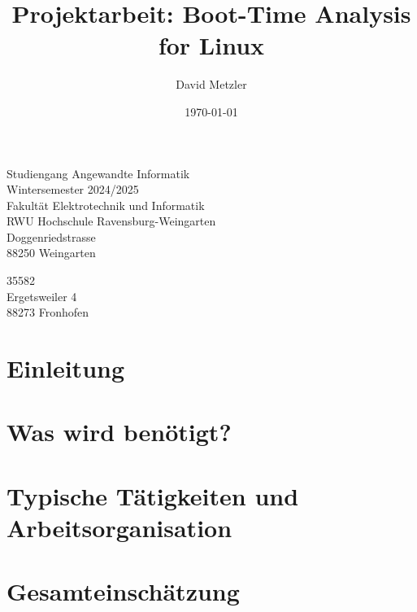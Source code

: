 \documentclass[12pt, a4paper]{scrartcl}
\author{David Metzler}
\title{Projektarbeit: Boot-Time Analysis for Linux}
\date{\today} %
\makeatletter
\newcommand{\maketitlefont}{
  \fontfamily{\rmdefault}\fontsize{28}{34}\selectfont %
}
\renewcommand{\maketitle}{
  \begin{titlepage}
    \centering
    \thispagestyle{titlestyle}
    \vspace{4em}
    {\Huge\bfseries\maketitlefont\@title\par}
    \vspace{4em}
    \large
    Studiengang Angewandte Informatik\\
    Wintersemester 2024/2025\\
    \vspace{3em}
    Fakultät Elektrotechnik und Informatik\\
    RWU Hochschule Ravensburg-Weingarten\\
    Doggenriedstrasse\\
    88250 Weingarten\\
    \vspace{3em}
    {\large\scshape\@author\par}
    35582\\
    Ergetsweiler 4\\
    88273 Fronhofen\\
    {\large\itshape\@date\par}
    \normalsize
    \vspace{1em}
  \end{titlepage}
  \clearpage
}
\makeatother
\begin{document}
\maketitle
\tableofcontents
\newpage
\section{Einleitung}

\newpage
\section{Was wird benötigt? }

\newpage
\section{Typische Tätigkeiten und Arbeitsorganisation}

\newpage
\section{Gesamteinschätzung}

\newpage
\printbibliography
\end{document}
